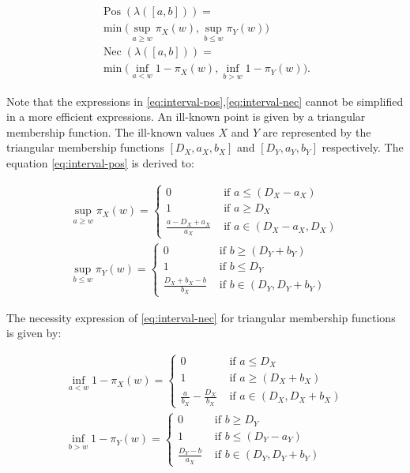 \documentclass[twoside,twocolumn,a4paper]{article}
\newcommand{\Pos}{\operatorname{Pos}}
\newcommand{\Nec}{\operatorname{Nec}}
\begin{document}
\begin{eqnarray}
\label{eq:interval-pos}
\Pos\left(\lambda([a,b])\right)=\\
\nonumber
\min\bigg(\sup_{a\geq w}\pi_{X}(w),\sup_{b\leq w}\pi_{Y}(w)\bigg)\\
\label{eq:interval-nec}
\Nec\left(\lambda([a,b])\right)=\\
\nonumber
\min\bigg(\inf_{a<w}1-\pi_{X}(w),\inf_{b>w}1-\pi_{Y}(w)\bigg).
\end{eqnarray}

Note that the expressions in \eqref{eq:interval-pos},\eqref{eq:interval-nec} cannot be simplified in a more efficient expressions. %
An ill-known point is given by a triangular membership function. The ill-known values $X$ and $Y$ are represented by the triangular membership functions $\left[D_X,a_X,b_X \right]$ and $\left[D_Y,a_Y,b_Y \right]$ respectively. The equation \eqref{eq:interval-pos} is derived to:

\begin{eqnarray}
\label{eq:interval-pos-triangular-a}
\sup_{a\geq w}\pi_{X}(w)=
\begin{cases}
0 & \mbox{\ if\ } a \leq \left( D_X - a_X \right) \\
1 & \mbox{\ if\ } a \geq D_X \\
 \frac{a-D_X+a_X}{a_X} & \mbox{\ if\ } a \in \left(D_X-a_X,D_X \right)
\end{cases}\\
\label{eq:interval-pos-triangular-b}
\sup_{b\leq w}\pi_{Y}(w)=
\begin{cases}
0 & \mbox{\ if\ } b \geq \left( D_Y + b_Y \right) \\
1 & \mbox{\ if\ } b \leq D_Y \\
 \frac{D_X+b_X-b}{b_X} & \mbox{\ if\ } b \in \left(D_Y,D_Y+b_Y \right) 
\end{cases}
\end{eqnarray}

The necessity expression of \eqref{eq:interval-nec} for triangular membership functions is given by:

\begin{eqnarray}
\label{eq:interval-nec-triangular-a}
\inf_{a<w}1-\pi_{X}(w)=
\begin{cases}
0 & \mbox{\ if\ } a \leq  D_X   \\
1 & \mbox{\ if\ } a \geq \left( D_X+b_X \right) \\
\frac{a}{b_X}- \frac{D_X}{b_X} & \mbox{\ if\ } a \in \left(D_X,D_X+b_X \right)
\end{cases}\\
\label{eq:interval-nec-triangular-b}
\inf_{b>w}1-\pi_{Y}(w)=
\begin{cases}
0 & \mbox{\ if\ } b \geq  D_Y \\
1 & \mbox{\ if\ } b \leq \left( D_Y - a_Y \right) \\
 \frac{D_Y-b}{a_X} & \mbox{\ if\ } b \in \left(D_Y,D_Y+b_Y \right) 
\end{cases}
\end{eqnarray}
\end{document}
